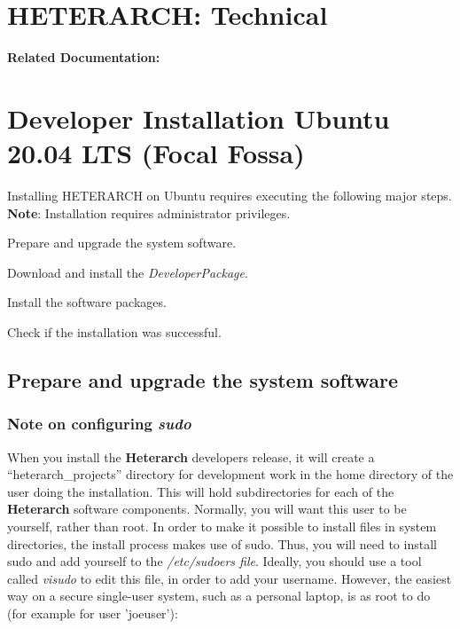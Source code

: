 \documentclass[12pt]{article}
\begin{document}
\section*{HETERARCH: Technical}

{\bf Related Documentation:} \\

\section*{Developer Installation Ubuntu 20.04 LTS (Focal Fossa)}

Installing HETERARCH on Ubuntu requires executing the following major steps. {\bf Note}: Installation requires administrator privileges.
\begin{description} 
   \item Prepare and upgrade the system software.
   \item Download and install the {\it DeveloperPackage}.
   \item Install the software packages.
   \item Check if the installation was successful. 
\end{description}

\subsection*{Prepare and upgrade the system software}

\subsubsection*{Note on configuring {\emph{sudo}}}

When you install the {\bf \small{Heterarch}} developers release, it will create a
``heterarch\_projects'' directory for development work in the home
directory of the user doing the installation.  This will hold
subdirectories for each of the  {\bf \small Heterarch} software components.  Normally, you
will want this user to be yourself, rather than root.  In order to
make it possible to install files in system directories, the install
process makes use of sudo.  Thus, you will need to install sudo and
add yourself to the {\it /etc/sudoers file}.  Ideally, you should use
a tool called {\it visudo} to edit this file, in order to add your
username.  However, the easiest way on a secure single-user system,
such as a personal laptop, is as root to do (for example for user
'joeuser'):
\end{document}
